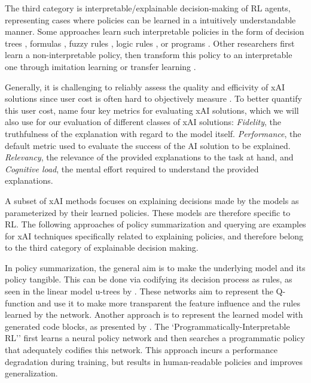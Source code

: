 \documentclass[twoside,11pt]{article}
\begin{document}
The third category is interpretable/explainable decision-making of RL agents, representing cases where policies can be learned in a intuitively understandable manner. Some approaches learn such interpretable policies in the form of decision trees \citep{likmeta2020combining,silva2020optimization,topin2021iterative}, formulas \citep{hein2018interpretable,hein2019generating}, fuzzy rules \citep{akrour2019towards,hein2017particle,zhang2021kogun}, logic rules \citep{jiang2019neural}, or programs \citep{sun2019program,verma2019imitation}. Other researchers first learn a non-interpretable policy, then transform this policy to an interpretable one through imitation learning or transfer learning \citep{bastani2018verifiable,VermaEtAl:2018:ProgrammaticallyInterpretableRL}.

Generally, it is challenging to reliably assess the quality and efficivity of xAI solutions since user cost is often hard to objectively measure \citep{bruneau2002eyes}. To better quantify this user cost, \cite{milani2022survey} name four key metrics for evaluating xAI solutions, which we will also use for our evaluation of different classes of xAI solutions: \emph{Fidelity}, the truthfulness of the explanation with regard to the model itself. \emph{Performance}, the default metric used to evaluate the success of the AI solution to be explained. \emph{Relevancy}, the relevance of the provided explanations to the task at hand, and \emph{Cognitive load}, the mental effort required to understand the provided explanations. 

A subset of xAI methods focuses on explaining decisions made by the models as parameterized by their learned policies. These models are therefore specific to RL. The following approaches of policy summarization and querying are examples for xAI techniques specifically related to explaining policies, and therefore belong to the third category of explainable decision making. 

In policy summarization, the general aim is to make the underlying model and its policy tangible. This can be done via codifying its decision process as rules, as seen in the linear model u-trees by \citet{LiuEtAl:2018:LinearModelUTrees}. These networks aim to represent the Q-function and use it to make more transparent the feature influence and the rules learned by the network. 
Another approach is to represent the learned model with generated code blocks, as presented by \citet{VermaEtAl:2018:ProgrammaticallyInterpretableRL}. The `Programmatically-Interpretable RL'' first learns a neural policy network and then searches a programmatic policy that adequately codifies this network. This approach incurs a performance degradation during training, but results in human-readable policies and improves generalization. 
\end{document}
